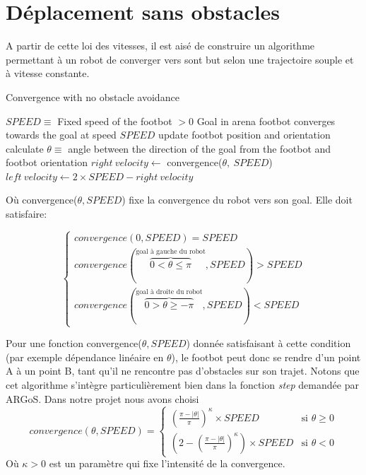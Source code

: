\section{Déplacement sans obstacles}

A partir de cette loi des vitesses, il est aisé de construire un algorithme permettant à un robot de converger vers sont but selon une trajectoire souple et à vitesse constante.

\begin{algorithm}                    
\caption{Convergence with no obstacle avoidance}
\label{simpleConvergence}
\begin{algorithmic}
  \REQUIRE \(SPEED \equiv \) Fixed speed of the footbot \(> 0\)
  \REQUIRE Goal in arena
  \ENSURE footbot converges towards the goal at speed \(SPEED\)
    \STATE update footbot position and orientation
    \STATE calculate \( \theta \equiv\) angle between the direction of the goal from the footbot and footbot orientation
    \STATE \( right\:velocity \gets\) convergence(\(\theta,\:SPEED\))
    \STATE \( left\:velocity \gets 2 \times SPEED-right\:velocity\) 
  \ENDWHILE
\end{algorithmic}
\end{algorithm}

Où convergence($\theta, SPEED$) fixe la convergence du robot vers son goal. Elle doit satisfaire:

\begin{equation}
  \begin{cases}
    convergence(0,SPEED)=SPEED\\
    convergence(\overset{\text{goal à gauche du robot}}{\overbrace{0<\theta\leq\pi}},SPEED)>SPEED\\
    convergence(\overset{\text{goal à droite du robot}}{\overbrace{0>\theta\geq-\pi}},SPEED)<SPEED
  \end{cases}
\end{equation}

Pour une fonction convergence($\theta, SPEED$) donnée satisfaisant à cette condition (par exemple dépendance linéaire en \(\theta\)), le footbot peut donc se rendre d'un point A à un point B, tant qu'il ne rencontre pas d'obstacles sur son trajet. Notons que cet algorithme s'intègre particulièrement bien dans la fonction \emph{step} demandée par ARGoS. Dans notre projet nous avons choisi
\[
convergence(\theta, SPEED)=
\begin{cases}
      { \left( \frac{\pi- \lvert \theta \rvert }{\pi} \right)}^{\kappa} \times SPEED & \text{si } \theta \geq 0\\
      \left( 2 - { \left( \frac{\pi- \lvert \theta \rvert }{\pi} \right) }^{\kappa} \right) \times SPEED & \text{si } \theta < 0
\end{cases}
\]
Où $\kappa > 0$ est un paramètre qui fixe l'intensité de la convergence.

